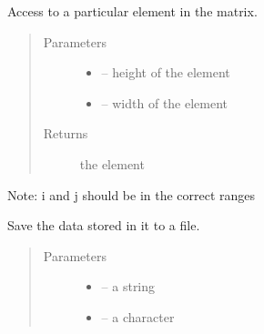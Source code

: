 \documentclass[letterpaper,10pt,english]{sphinxmanual}
\begin{document}
\begin{fulllineitems}
\begin{fulllineitems}
\end{fulllineitems}


\begin{fulllineitems}
\label{\detokenize{index:dbm_py.interface.Matrix.get}}
Access to a particular element in the matrix.
\begin{quote}\begin{description}
\item[{Parameters}] \leavevmode\begin{itemize}
\item {} 
 -- height of the element

\item {} 
 -- width of the element

\end{itemize}

\item[{Returns}] \leavevmode
the element

\end{description}\end{quote}

Note: i and j should be in the correct ranges

\end{fulllineitems}


\begin{fulllineitems}
\label{\detokenize{index:dbm_py.interface.Matrix.save}}
Save the data stored in it to a file.
\begin{quote}\begin{description}
\item[{Parameters}] \leavevmode\begin{itemize}
\item {} 
 -- a string

\item {} 
 -- a character

\end{itemize}

\end{description}\end{quote}


\end{fulllineitems}
\end{fulllineitems}
\end{document}
